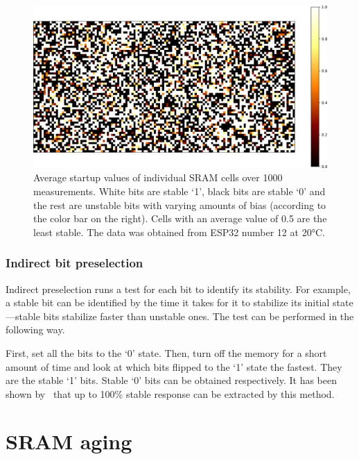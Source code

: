 \begin{figure}[ht!]
    \centering
    \captionsetup{justification=justified,margin=0.5cm}
    \includegraphics[width=\textwidth]{images/bit_stability.png}
    \caption[Average startup values of individual SRAM cells over 1000 measurements.]{Average startup values of individual SRAM cells over 1000 measurements. White bits are stable `1', black bits are stable `0' and the rest are unstable bits with varying amounts of bias (according to the color bar on the right). Cells with an average value of 0.5 are the least stable. The data was obtained from ESP32 number 12 at 20°C.}
    \label{fig:bit_stability_mask}
\end{figure}

\subsubsection*{Indirect bit preselection}\label{sec:indirect_bit_preselection}

Indirect preselection runs a test for each bit to identify its stability. For example, a stable bit can be identified by the time it takes for it to stabilize its initial state---stable bits stabilize faster than unstable ones. The test can be performed in the following way.

First, set all the bits to the `0' state. Then, turn off the memory for a short amount of time and look at which bits flipped to the `1' state the fastest. They are the stable `1' bits. Stable `0' bits can be obtained respectively. It has been shown by~\cite{Liu2017} that up to 100\% stable response can be extracted by this method.

\section{SRAM aging}


